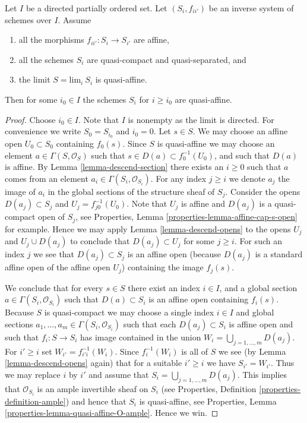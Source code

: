 \begin{lemma}
\label{lemma-limit-quasi-affine}
Let $I$ be a directed partially ordered set.
Let $(S_i, f_{ii'})$ be an inverse system of
schemes over $I$. Assume
\begin{enumerate}
\item all the morphisms $f_{ii'} : S_i \to S_{i'}$ are affine,
\item all the schemes $S_i$ are quasi-compact and quasi-separated, and
\item the limit $S = \text{lim}_i\ S_i$ is quasi-affine.
\end{enumerate}
Then for some $i_0 \in I$ the schemes $S_i$ for $i \geq i_0$
are quasi-affine.
\end{lemma}

\begin{proof}
Choose $i_0 \in I$. Note that $I$ is nonempty as the limit is directed.
For convenience we write $S_0 = S_{i_0}$ and $i_0 = 0$.
Let $s \in S$. We may choose an affine open
$U_0 \subset S_0$ containing $f_0(s)$. Since $S$ is quasi-affine
we may choose an element $a \in \Gamma(S, \mathcal{O}_S)$ such
that $s \in D(a) \subset f_0^{-1}(U_0)$, and such that
$D(a)$ is affine. By Lemma \ref{lemma-descend-section}
there exists an $i \geq 0$ such that $a$
comes from an element $a_i \in \Gamma(S_i, \mathcal{O}_{S_i})$.
For any index $j \geq i$ we denote $a_j$
the image of $a_i$ in the global sections of the
structure sheaf of $S_j$.
Consider the opens $D(a_j) \subset S_j$
and $U_j = f_{j0}^{-1}(U_0)$. Note that
$U_j$ is affine and $D(a_j)$ is a quasi-compact open of $S_j$,
see Properties, Lemma \ref{properties-lemma-affine-cap-s-open}
for example. Hence we may apply Lemma \ref{lemma-descend-opens} to the opens
$U_j$ and $U_j \cup D(a_j)$ to conclude that
$D(a_j) \subset U_j$ for some  $j \geq i$.
For such an index $j$ we see that $D(a_j) \subset S_j$ is an affine open
(because $D(a_j)$ is a standard affine open of the affine open $U_j$)
containing the image $f_j(s)$.

\medskip\noindent
We conclude that for every $s \in S$ there exist
an index $i \in I$, and a global section
$a \in \Gamma(S_i, \mathcal{O}_{S_i})$
such that $D(a) \subset S_i$ is an affine open
containing $f_i(s)$. Because $S$ is quasi-compact we
may choose a single index $i \in I$ and global sections
$a_1, \ldots, a_m \in \Gamma(S_i, \mathcal{O}_{S_i})$
such that each $D(a_j) \subset S_i$ is affine open
and such that $f_i : S \to S_i$ has image contained
in the union $W_i = \bigcup_{j = 1, \ldots, m} D(a_j)$.
For $i' \geq i$ set $W_{i'} = f_{i'i}^{-1}(W_i)$.
Since $f_i^{-1}(W_i)$ is all of $S$ we see
(by Lemma \ref{lemma-descend-opens} again)
that for a suitable $i' \geq i$ we
have $S_{i'} = W_{i'}$. Thus we may replace $i$ by
$i'$ and assume that $S_i = \bigcup_{j = 1, \ldots, m} D(a_j)$.
This implies that $\mathcal{O}_{S_i}$ is an ample invertible
sheaf on $S_i$ (see Properties, Definition \ref{properties-definition-ample})
and hence that $S_i$ is quasi-affine, see
Properties, Lemma \ref{properties-lemma-quasi-affine-O-ample}.
Hence we win.
\end{proof}

